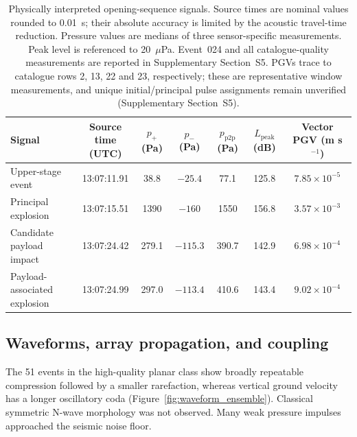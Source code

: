 \documentclass[]{seismica}
\begin{document}
\begin{table}[!tbp]
\caption{Physically interpreted opening-sequence signals. Source times are
nominal values rounded to 0.01~s; their absolute accuracy is limited by the
acoustic travel-time reduction. Pressure values are medians of three
sensor-specific measurements. Peak level is referenced to
20~$\mu$Pa. Event~024 and all catalogue-quality measurements are reported in
Supplementary Section~S5. PGVs trace to catalogue rows 2, 13, 22 and 23, respectively;
these are representative window measurements, and unique initial/principal
pulse assignments remain unverified (Supplementary Section~S5).}
\label{tab:principal_events}
\centering
\small
\begin{tabularx}{\textwidth}{Xcccccc}
\hline
Signal & \shortstack{Source time\\(UTC)} & $p_+$ (Pa) & $p_-$ (Pa) & $p_{\mathrm{p2p}}$ (Pa) & \shortstack{$L_{\mathrm{peak}}$\\(dB)} & \shortstack{Vector PGV\\(m s$^{-1}$)} \\
\hline
Upper-stage event & 13:07:11.91 & 38.8 & $-25.4$ & 77.1 & 125.8 & $7.85\times10^{-5}$ \\
Principal explosion & 13:07:15.51 & 1390 & $-160$ & 1550 & 156.8 & $3.57\times10^{-3}$ \\
Candidate payload impact & 13:07:24.42 & 279.1 & $-115.3$ & 390.7 & 142.9 & $6.98\times10^{-4}$ \\
Payload-associated explosion & 13:07:24.99 & 297.0 & $-113.4$ & 410.6 & 143.4 & $9.02\times10^{-4}$ \\
\hline
\end{tabularx}
\end{table}
\FloatBarrier

\subsection{Waveforms, array propagation, and coupling}

The 51 events in the high-quality planar class show broadly repeatable
compression followed by a smaller rarefaction, whereas vertical ground
velocity has a longer oscillatory coda (Figure~\ref{fig:waveform_ensemble}).
Classical symmetric N-wave morphology was not observed. Many weak pressure
impulses approached the seismic noise floor.
\end{document}
